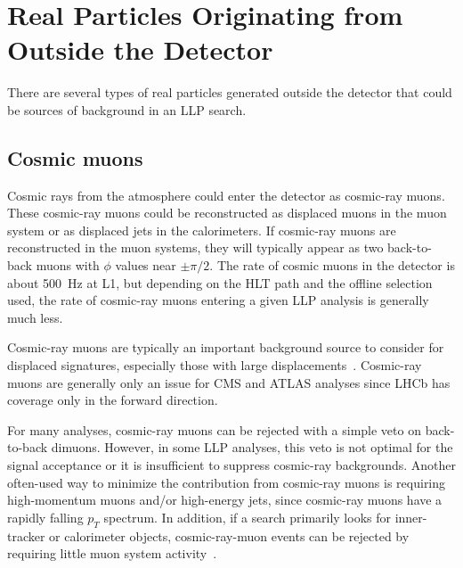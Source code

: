 
\section{Real Particles Originating from Outside the Detector} %

There are several types of real particles generated outside the detector that could be sources of background in an LLP search.

\subsection{Cosmic muons} %

Cosmic rays from the atmosphere could enter the detector as cosmic-ray muons. These cosmic-ray muons could be reconstructed as displaced muons in the muon system or as displaced jets in the calorimeters. If cosmic-ray muons are reconstructed in the muon systems, they will typically appear as two back-to-back muons with $\phi$ values near $\pm\pi/2$. The rate of cosmic muons in the detector is about 500~Hz at L1, but depending on the HLT path and the offline selection used, the rate of cosmic-ray muons entering a given LLP analysis is generally much less.

Cosmic-ray muons are typically an important background source to consider for displaced signatures, especially those with large displacements~\cite{Khachatryan:2015jha, Chatrchyan:2012dxa, Khachatryan:2010uf, Aad:2012zn,Aad:2013gva}. Cosmic-ray muons are generally only an issue for CMS and ATLAS analyses since LHCb has coverage only in the forward direction.

For many analyses, cosmic-ray muons can be rejected with a simple veto on back-to-back dimuons. However, in some LLP analyses, this veto is not optimal for the signal acceptance or it is insufficient to suppress cosmic-ray backgrounds. Another often-used way to minimize the contribution from cosmic-ray muons is requiring high-momentum muons and/or high-energy jets, since cosmic-ray muons have a rapidly falling $p_{T}$ spectrum. In addition, if a search primarily looks for inner-tracker or calorimeter objects, cosmic-ray-muon events can be rejected by requiring little muon system activity~\cite{Khachatryan:2015jha, Chatrchyan:2012dxa, Khachatryan:2010uf}.

